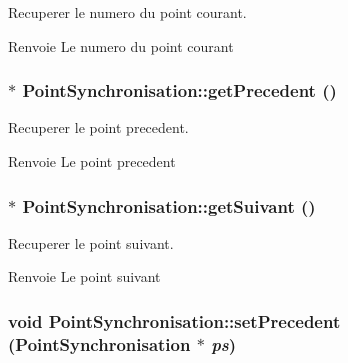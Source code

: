 Recuperer le numero du point courant. 

\begin{DoxyReturn}{Renvoie}
Le numero du point courant 
\end{DoxyReturn}
\hypertarget{classPointSynchronisation_a7929df6ad2b116b1831c18561000f1bd}{
\subsubsection[{getPrecedent}]{ $\ast$ PointSynchronisation::getPrecedent ()}}
\label{classPointSynchronisation_a7929df6ad2b116b1831c18561000f1bd}


Recuperer le point precedent. 

\begin{DoxyReturn}{Renvoie}
Le point precedent 
\end{DoxyReturn}
\hypertarget{classPointSynchronisation_a0e5b8f12043e94e9bf5b4a1d798830ff}{
\subsubsection[{getSuivant}]{ $\ast$ PointSynchronisation::getSuivant ()}}
\label{classPointSynchronisation_a0e5b8f12043e94e9bf5b4a1d798830ff}


Recuperer le point suivant. 

\begin{DoxyReturn}{Renvoie}
Le point suivant 
\end{DoxyReturn}
\hypertarget{classPointSynchronisation_a91a058d0174071f36d6132b3afcafdc3}{
\subsubsection[{setPrecedent}]{\setlength{\rightskip}{0pt plus 5cm}void PointSynchronisation::setPrecedent ({\bf PointSynchronisation} $\ast$ {\em ps})}}
\label{classPointSynchronisation_a91a058d0174071f36d6132b3afcafdc3}


